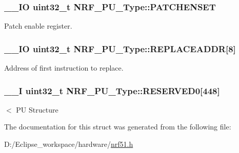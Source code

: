 \subsubsection[{P\+A\+T\+C\+H\+E\+N\+S\+E\+T}]{\setlength{\rightskip}{0pt plus 5cm}\+\_\+\+\_\+\+I\+O uint32\+\_\+t N\+R\+F\+\_\+\+P\+U\+\_\+\+Type\+::\+P\+A\+T\+C\+H\+E\+N\+S\+E\+T}\label{struct_n_r_f___p_u___type_ab7899ebde7f7f7a6fd310cb27f287d5a}
Patch enable register. \hypertarget{struct_n_r_f___p_u___type_ae79251eb357774997fb4b52138e05d43}{}
\subsubsection[{R\+E\+P\+L\+A\+C\+E\+A\+D\+D\+R}]{\setlength{\rightskip}{0pt plus 5cm}\+\_\+\+\_\+\+I\+O uint32\+\_\+t N\+R\+F\+\_\+\+P\+U\+\_\+\+Type\+::\+R\+E\+P\+L\+A\+C\+E\+A\+D\+D\+R\mbox{[}8\mbox{]}}\label{struct_n_r_f___p_u___type_ae79251eb357774997fb4b52138e05d43}
Address of first instruction to replace. \hypertarget{struct_n_r_f___p_u___type_ae85bd5d6ac8fe3129c6ca67aa812daa1}{}
\subsubsection[{R\+E\+S\+E\+R\+V\+E\+D0}]{\setlength{\rightskip}{0pt plus 5cm}\+\_\+\+\_\+\+I uint32\+\_\+t N\+R\+F\+\_\+\+P\+U\+\_\+\+Type\+::\+R\+E\+S\+E\+R\+V\+E\+D0\mbox{[}448\mbox{]}}\label{struct_n_r_f___p_u___type_ae85bd5d6ac8fe3129c6ca67aa812daa1}
$<$ P\+U Structure 

The documentation for this struct was generated from the following file\+:\begin{DoxyCompactItemize}
\item 
D\+:/\+Eclipse\+\_\+workspace/hardware/\hyperlink{nrf51_8h}{nrf51.\+h}\end{DoxyCompactItemize}
